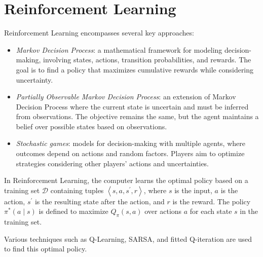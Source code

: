 \section{Reinforcement Learning}

Reinforcement Learning encompasses several key approaches:
\begin{itemize}
    \item \textit{Markov Decision Process}: a mathematical framework for modeling decision-making, involving states, actions, transition probabilities, and rewards. 
        The goal is to find a policy that maximizes cumulative rewards while considering uncertainty.
    \item \textit{Partially Observable Markov Decision Process}: an extension of Markov Decision Process where the current state is uncertain and must be inferred from observations. 
        The objective remains the same, but the agent maintains a belief over possible states based on observations.
    \item \textit{Stochastic games}: models for decision-making with multiple agents, where outcomes depend on actions and random factors. 
        Players aim to optimize strategies considering other players' actions and uncertainties.
\end{itemize}
In Reinforcement Learning, the computer learns the optimal policy based on a training set $\mathcal{D}$ containing tuples $\left\langle s,a,s^\prime,r \right\rangle$, where $s$ is the input, $a$ is the action, $s^\prime$ is the resulting state after the action, and $r$ is the reward.
The policy $\pi^\ast(a \mid s)$ is defined to maximize $Q_\pi(s,a)$ over actions $a$ for each state $s$ in the training set. 

Various techniques such as Q-Learning, SARSA, and fitted Q-iteration are used to find this optimal policy.